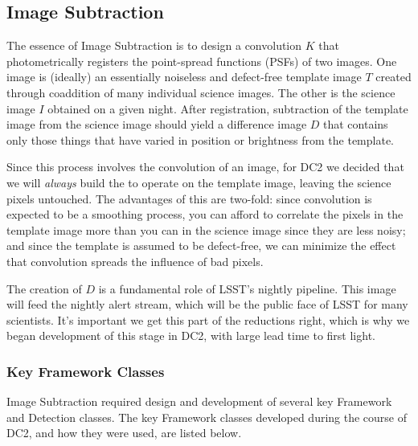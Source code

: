 
\subsection{Image Subtraction}
\label{ImageSubtraction}\label{sApp-imsub}

The essence of Image Subtraction is to design a convolution
 $K$ that  photometrically registers the
point-spread functions (PSFs) of two images.  One image is (ideally)
an essentially noiseless and defect-free template image $T$ created through
coaddition of many individual science images.  The other is the
science image $I$ obtained on a given night.  After registration,
subtraction of the template image from the science image should yield
a difference image $D$ that contains only those things that have
varied in position or brightness from the template.

Since this process involves the convolution of an image, for DC2 we
decided that we will \textit{always} build the  to operate
on the template image, leaving the science pixels untouched.  The
advantages of this are two-fold: since convolution is
expected to be a smoothing process, you can afford to correlate the
pixels in the template image more than you can in the science image
since they are less noisy; and since the template is assumed to be
defect-free, we can minimize the effect that convolution spreads the
influence of bad pixels.  

The creation of $D$ is a fundamental role of LSST's nightly pipeline.
This image will feed the nightly alert stream, which will be the public face
of LSST for many scientists.  It's important we get this part of the
reductions right, which is why we began development of this stage in
DC2, with large lead time to first light.

\subsubsection{Key Framework Classes}

Image Subtraction required design and development of several key
Framework and Detection classes.  The key Framework classes developed
during the course of DC2, and how they were used, are listed below.

